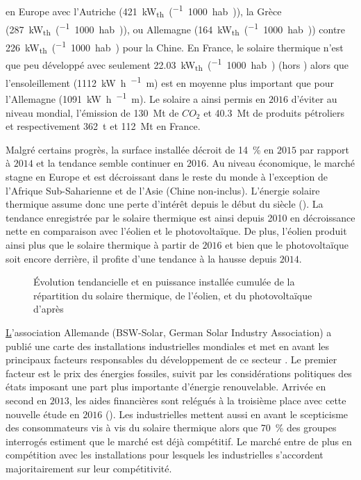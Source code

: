 en Europe avec l’Autriche (\SI{421}{\kilo\watt_{th}\per(1000 hab.)}), la Grèce
(\SI{287}{\kilo\watt_{th}\per(1000 hab.)}), ou Allemagne
(\SI{164}{\kilo\watt_{th}\per(1000 hab.)}) contre \SI{226}{\kilo\watt_{th}\per(1000 hab.)}
pour la Chine. En France, le solaire thermique n’est que peu développé avec seulement
\SI{22.03}{\kilo\watt_{th}\per(1000 hab.)} (hors ) alors que l’ensoleillement
(\SI{1112}{\kilo\watt\hour\per\squared\metre}) est en moyenne plus important que
pour l’Allemagne (\SI{1091}{\kilo\watt\hour\per\squared\metre}).
Le solaire a ainsi permis en $2016$ d’éviter au niveau mondial, l’émission de
\SI{130}{\mega\tonne} de $CO_{2}$ et \SI{40.3}{\mega\tonne} de produits pétroliers et
respectivement \SI{362}{\tonne} et \SI{112}{\mega\tonne} en France.

Malgré certains progrès, la surface installée décroit de \SI{14}{\percent} en
$2015$ par rapport à $2014$ et la tendance semble continuer en $2016$. Au niveau
économique, le marché stagne en Europe et est décroissant dans le reste du monde à
l’exception de l’Afrique Sub-Saharienne et de l’Asie (Chine non-inclus).
L’énergie solaire thermique assume donc une perte d’intérêt depuis le début du siècle
(). La tendance enregistrée par le solaire thermique est ainsi
depuis 2010 en décroissance nette en comparaison avec l’éolien et le photovoltaïque. De
plus, l’éolien produit ainsi plus que le solaire thermique à partir de $2016$ et bien que
le photovoltaïque soit encore derrière, il profite d’une tendance à la hausse depuis
$2014$.

\begin{figure}
    \centering
    \caption{Évolution tendancielle et en puissance installée cumulée de la répartition
             du solaire thermique, de l’éolien, et du photovoltaïque d’après
             \textcite{Weiss2017}}
    \label{fig:tendances_enr}
\end{figure}
\href{http://www.sunwindenergy.com/content/solar-process-heat-surprisingly-popular}
L’association Allemande (\textsf{BSW-Solar}, German Solar Industry Association)
a publié une carte des installations industrielles mondiales et met en avant les
principaux facteurs responsables du développement de ce secteur \parencite{Augsten2017}.
Le premier facteur est le prix des énergies fossiles, suivit par les considérations
politiques des états imposant une part plus importante d’énergie renouvelable. Arrivée
en second en $2013$, les aides financières sont relégués à la troisième place avec
cette nouvelle étude en $2016$ (). Les industrielles
mettent aussi en avant le scepticisme des consommateurs vis à vis du solaire thermique
alors que \SI{70}{\percent} des groupes interrogés estiment que le marché est déjà
compétitif. Le marché entre de plus en compétition avec les installations  pour
lesquels les industrielles s’accordent majoritairement sur leur compétitivité.

